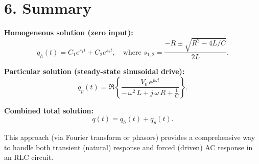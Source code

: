 \documentclass{article}
\begin{document}
\vspace{1em}
\section*{6. Summary}

\noindent \textbf{Homogeneous solution (zero input):}
\[
q_h(t) = C_1 e^{s_1 t} + C_2 e^{s_2 t}, \quad \text{where } s_{1,2} = \frac{-R \pm \sqrt{R^2 - 4L/C}}{2L}.
\]

\noindent \textbf{Particular solution (steady-state sinusoidal drive):}
\[
q_p(t) = \Re\!\left\{\frac{V_0\, e^{j\omega t}}{-\,\omega^2\,L + j\,\omega\,R + \tfrac{1}{C}}\right\}.
\]

\noindent \textbf{Combined total solution:}
\[
q(t) = q_h(t) + q_p(t).
\]

\noindent This approach (via Fourier transform or phasors) provides a comprehensive way to handle both transient (natural) response and forced (driven) AC response in an RLC circuit.
\end{document}
